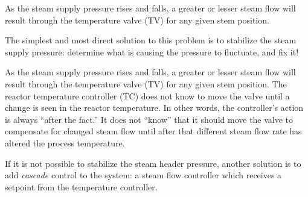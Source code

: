 
As the steam supply pressure rises and falls, a greater or lesser steam flow will result through the temperature valve (TV) for any given stem position.

The simplest and most direct solution to this problem is to stabilize the steam supply pressure: determine what is causing the pressure to fluctuate, and fix it!







As the steam supply pressure rises and falls, a greater or lesser steam flow will result through the temperature valve (TV) for any given stem position.  The reactor temperature controller (TC) does not know to move the valve until a change is seen in the reactor temperature.  In other words, the controller's action is always ``after the fact.''  It does not ``know'' that it should move the valve to compensate for changed steam flow until after that different steam flow rate has altered the process temperature.

If it is not possible to stabilize the steam header pressure, another solution is to add {\it cascade} control to the system: a steam flow controller which receives a setpoint from the temperature controller.




